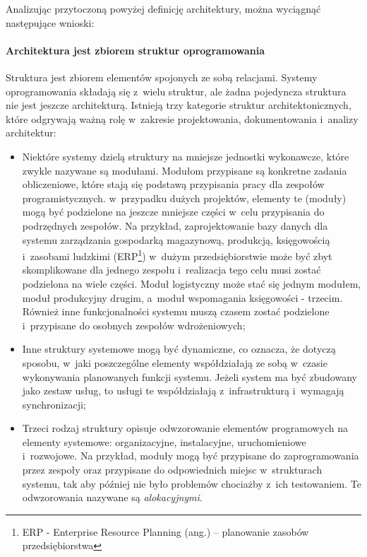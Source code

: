 Analizując przytoczoną powyżej definicję architektury, można wyciągnąć następujące wnioski:

\paragraph{Architektura jest zbiorem struktur oprogramowania\newline\newline}
Struktura jest zbiorem elementów spojonych ze sobą relacjami. Systemy oprogramowania składają się z~wielu struktur, ale żadna pojedyncza struktura nie jest jeszcze architekturą. Istnieją trzy kategorie struktur architektonicznych, które odgrywają ważną rolę w~zakresie projektowania, dokumentowania i~analizy architektur:
\begin{itemize}
\item
Niektóre systemy dzielą struktury na mniejsze jednostki wykonawcze, które zwykle nazywane są modułami. Modułom przypisane są konkretne zadania obliczeniowe, które stają się podstawą przypisania pracy dla zespołów programistycznych. w~przypadku dużych projektów, elementy te (moduły) mogą być podzielone na jeszcze mniejsze części w~celu przypisania do podrzędnych zespołów. Na przykład, zaprojektowanie bazy danych dla systemu zarządzania gospodarką magazynową, produkcją, księgowością i~zasobami ludzkimi (ERP\footnote{ERP - Enterprise Resource Planning (ang.) – planowanie zasobów przedsiębiorstwa}) w~dużym przedsiębiorstwie może być zbyt skomplikowane dla jednego zespołu i~realizacja tego celu musi zostać podzielona na wiele części. Moduł logistyczny może stać się jednym modułem, moduł produkcyjny drugim, a~moduł wspomagania księgowości - trzecim. Również inne funkcjonalności systemu muszą czasem zostać podzielone i~przypisane do osobnych zespołów wdrożeniowych;
\item
Inne struktury systemowe mogą być dynamiczne, co oznacza, że dotyczą sposobu, w~jaki poszczególne elementy współdziałają ze sobą w~czasie wykonywania planowanych funkcji systemu. Jeżeli system ma być zbudowany jako zestaw usług, to usługi te współdziałają z~infrastrukturą i~wymagają synchronizacji; 

\item
Trzeci rodzaj struktury opisuje odwzorowanie elementów programowych na elementy systemowe: organizacyjne, instalacyjne, uruchomieniowe i~rozwojowe. Na przykład, moduły mogą być przypisane do zaprogramowania przez zespoły oraz przypisane do odpowiednich miejsc w~strukturach systemu, tak aby później nie było problemów chociażby z~ich testowaniem.
Te odwzorowania nazywane są \textit{alokacyjnymi}.

\end{itemize}

